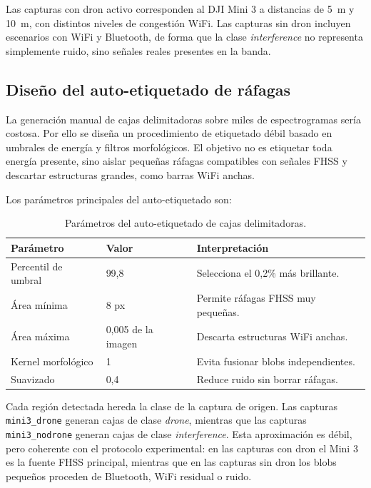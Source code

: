 Las capturas con dron activo corresponden al DJI Mini 3 a distancias de \SI{5}{\meter} y \SI{10}{\meter}, con distintos niveles de congestión WiFi. Las capturas sin dron incluyen escenarios con WiFi y Bluetooth, de forma que la clase \emph{interference} no representa simplemente ruido, sino señales reales presentes en la banda.

\subsection{Diseño del auto-etiquetado de ráfagas}
\label{subsec:diseno_autolabel}

La generación manual de cajas delimitadoras sobre miles de espectrogramas sería costosa. Por ello se diseña un procedimiento de etiquetado débil basado en umbrales de energía y filtros morfológicos. El objetivo no es etiquetar toda energía presente, sino aislar pequeñas ráfagas compatibles con señales FHSS y descartar estructuras grandes, como barras WiFi anchas.

Los parámetros principales del auto-etiquetado son:

\begin{table}[htbp]
\centering
\caption{Parámetros del auto-etiquetado de cajas delimitadoras.}
\label{tab:parametros_autolabel}
\begin{tabular}{lll}
\toprule
\textbf{Parámetro} & \textbf{Valor} & \textbf{Interpretación} \\
\midrule
Percentil de umbral & 99,8 & Selecciona el 0,2\% más brillante. \\
Área mínima & 8 px & Permite ráfagas FHSS muy pequeñas. \\
Área máxima & 0,005 de la imagen & Descarta estructuras WiFi anchas. \\
Kernel morfológico & 1 & Evita fusionar blobs independientes. \\
Suavizado & 0,4 & Reduce ruido sin borrar ráfagas. \\
\bottomrule
\end{tabular}
\end{table}

Cada región detectada hereda la clase de la captura de origen. Las capturas \texttt{mini3\_drone} generan cajas de clase \emph{drone}, mientras que las capturas \texttt{mini3\_nodrone} generan cajas de clase \emph{interference}. Esta aproximación es débil, pero coherente con el protocolo experimental: en las capturas con dron el Mini 3 es la fuente FHSS principal, mientras que en las capturas sin dron los blobs pequeños proceden de Bluetooth, WiFi residual o ruido.

